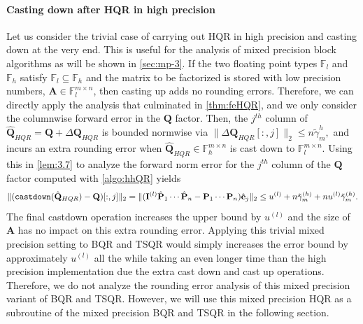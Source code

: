 \documentclass[review,onefignum,onetabnum]{siamart190516}
\newcommand{\F}{\mathbb{F}}
\newcommand{\bb}[1]{\mathbf{#1}}
\begin{document}
\paragraph{Casting down after HQR in high precision} Let us consider the trivial case of carrying out HQR in high precision and casting down at the very end.
This is useful for the analysis of mixed precision
block algorithms as will be shown in \cref{sec:mp-3}.
If the two floating point types $\F_{l}$ and $\F_{h}$ satisfy $\F_{l}\subseteq \F_{h}$
and the matrix to be factorized is stored with low precision numbers, $\bb{A}\in\F_{l}^{m\times n}$, then casting up adds no rounding errors.
Therefore, we can directly apply the analysis that culminated in \cref{thm:feHQR}, and we only consider the columnwise forward error in the $\bb{Q}$ factor.
Then, the $j^{th}$ column of $\hat{\bb{Q}}_{HQR} = \bb{Q} + \Delta \bb{Q}_{HQR}$ is bounded normwise via $\|\Delta \bb{Q}_{HQR}[:,j]\|_2 \leq n\tilde{\gamma}_{m}^{h},$ and incurs an extra rounding error when $\hat{\bb{Q}}_{HQR}\in\F_{h}^{m\times n}$ is cast down to $\F_{l}^{m\times n}$.
Using this in \cref{lem:3.7} to analyze the forward norm error for the $j^{th}$ column of the $\bb{Q}$ factor computed with \cref{algo:hhQR} yields
\begin{equation}
	\|(\text{\tt castdown}(\hat{\bb{Q}}_{HQR})- \bb{Q})[:,j]\|_2 = \|(\bb{I}^{(l)}\hat{\bb{P}}_{1}\cdots\hat{\bb{P}}_{n}-\bb{P}_{1}\cdots\bb{P}_{n})\hat{\bb{e}}_j\|_2 \leq u^{(l)}+n\tilde{\gamma}_m^{(h)} + nu^{(l)}\tilde{\gamma}_m^{(h)}.\label{eqn:HQR-mp}
\end{equation}
The final castdown operation increases the upper bound by $u^{(l)}$ and the size of $\bb{A}$ has no impact on this extra rounding error.
Applying this trivial mixed precision setting to BQR and TSQR would simply increases the error bound by approximately $u^{(l)}$ all the while taking an even longer time than the high precision implementation due the extra cast down and cast up operations.
Therefore, we do not analyze the rounding error analysis of this mixed precision variant of BQR and TSQR.
However, we will use this mixed precision HQR as a subroutine of the mixed precision BQR and TSQR in the following section.
%
\end{document}
